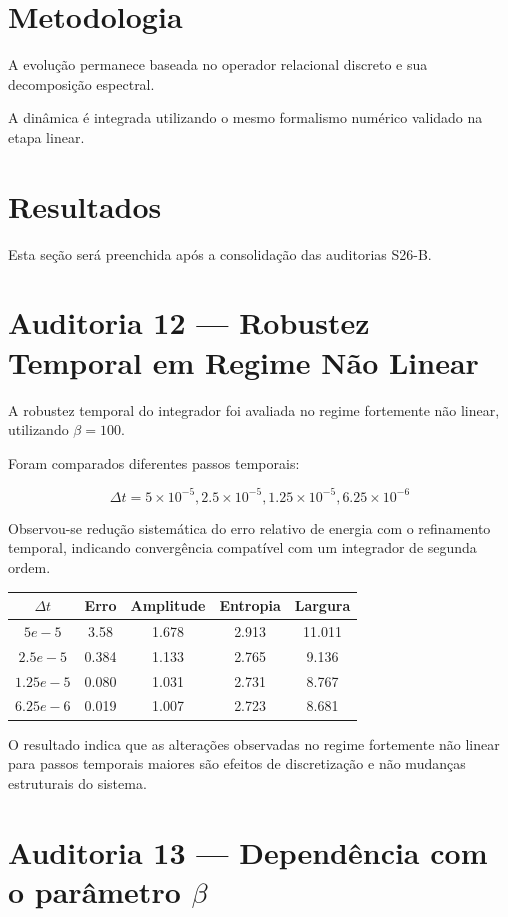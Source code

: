 \documentclass[11pt,a4paper]{article}
\begin{document}
\section{Metodologia}

A evolução permanece baseada no operador relacional
discreto e sua decomposição espectral.

A dinâmica é integrada utilizando o mesmo formalismo
numérico validado na etapa linear.


\section{Resultados}

Esta seção será preenchida após a consolidação das
auditorias S26-B.

\section{Auditoria 12 — Robustez Temporal em Regime Não Linear}

A robustez temporal do integrador foi avaliada no regime
fortemente não linear, utilizando $\beta=100$.

Foram comparados diferentes passos temporais:

\[
\Delta t =
5\times10^{-5},
2.5\times10^{-5},
1.25\times10^{-5},
6.25\times10^{-6}
\]

Observou-se redução sistemática do erro relativo de energia
com o refinamento temporal, indicando convergência compatível
com um integrador de segunda ordem.

\begin{table}[h]
\centering
\begin{tabular}{ccccc}
\toprule
$\Delta t$ & Erro & Amplitude & Entropia & Largura\\
\midrule
$5e-5$ & 3.58 & 1.678 & 2.913 & 11.011\\
$2.5e-5$ & 0.384 & 1.133 & 2.765 & 9.136\\
$1.25e-5$ & 0.080 & 1.031 & 2.731 & 8.767\\
$6.25e-6$ & 0.019 & 1.007 & 2.723 & 8.681\\
\bottomrule
\end{tabular}
\end{table}

O resultado indica que as alterações observadas no regime
fortemente não linear para passos temporais maiores são
efeitos de discretização e não mudanças estruturais do sistema.

\section{Auditoria 13 — Dependência com o parâmetro $\beta$}
\end{document}
